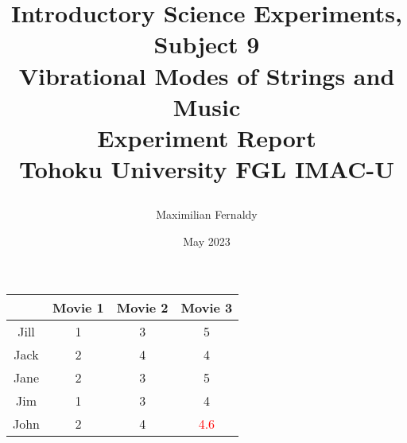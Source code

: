 \documentclass{report}
\title{Introductory Science Experiments, Subject 9 \\ Vibrational Modes of Strings and Music \\ Experiment Report \\
{\Large Tohoku University FGL IMAC-U}

\begin{figure}[h]
    \centering
\end{figure}
}
\author{Maximilian Fernaldy}
\date{May 2023}
\begin{document}
\maketitle

\large

\begin{table}[h]
    \centering
    \begin{tabular}{|c|c|c|c|}
        \hline
        & Movie 1 & Movie 2 & Movie 3 \\
        \hline
        Jill & 1 & 3 & 5 \\
        Jack & 2 & 4 & 4 \\
        Jane & 2 & 3 & 5 \\
        Jim & 1 & 3 & 4 \\
        John & 2 & 4 & \textcolor{red}{4.6} \\
        \hline
    \end{tabular}
\end{table}
\end{document}

